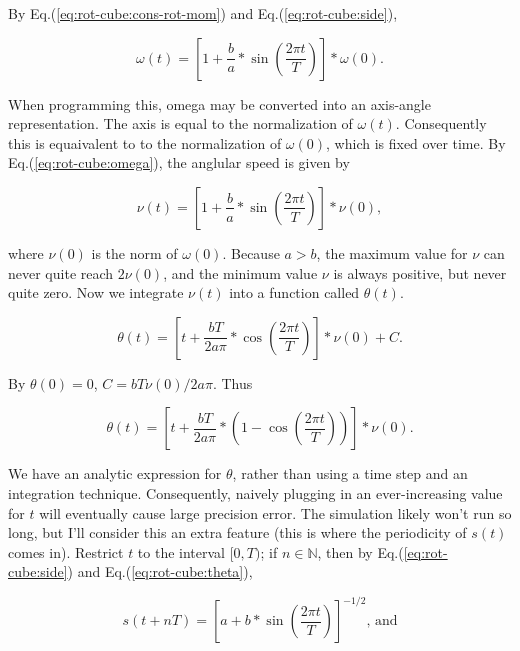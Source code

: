 \documentclass[a4paper,12pt]{book}
\begin{document}
By Eq.(\ref{eq:rot-cube:cons-rot-mom}) and Eq.(\ref{eq:rot-cube:side}),

\begin{equation}\label{eq:rot-cube:omega}
\omega(t) = \left[ 1 + \frac{b}{a} * \sin\left(\frac{2 \pi t}{T}\right) \right] * \omega(0).
\end{equation}

When programming this, omega may be converted into an axis-angle representation. The axis is equal to the normalization of $\omega(t)$. Consequently this is equaivalent to to the normalization of $\omega(0)$, which is fixed over time. By Eq.(\ref{eq:rot-cube:omega}), the anglular speed is given by

\begin{equation}\label{eq:rot-cub:nu}
\nu(t) = \left[ 1 + \frac{b}{a} * \sin\left(\frac{2 \pi t}{T}\right) \right] * \nu(0),
\end{equation}

where $\nu(0)$ is the norm of $\omega(0)$. Because $a > b$, the maximum value for $\nu$ can never quite reach $2 \nu(0)$, and the minimum value $\nu$ is always positive, but never quite zero. Now we integrate $\nu(t)$ into a function called $\theta(t)$.

\begin{equation*}
\theta(t) = \left[t + \frac{b T}{2 a \pi} * \cos\left(\frac{2 \pi t}{T}\right) \right] * \nu(0) + C.
\end{equation*}

By $\theta(0)= 0$, $C = b T \nu(0) / 2 a \pi$. Thus

\begin{equation}\label{eq:rot-cube:theta}
\theta(t) = \left[t + \frac{b T}{2 a \pi} * \left( 1 - \cos\left(\frac{2 \pi t}{T}\right) \right) \right] * \nu(0).
\end{equation}

We have an analytic expression for $\theta$, rather than using a time step and an integration technique. 
Consequently, naively plugging in an ever-increasing value for $t$ will eventually cause large precision error. 
The simulation likely won't run so long, but I'll consider this an extra feature (this is where the periodicity of $s(t)$ comes in). Restrict $t$ to the interval $[0,T)$; if $n \in \mathbb{N}$, then by Eq.(\ref{eq:rot-cube:side}) and Eq.(\ref{eq:rot-cube:theta}),


\begin{equation*}
s(t + n T) = \left[ a + b * \sin\left(\frac{2 \pi t}{T}\right) \right]^{-1/2}\text{, and}
\end{equation*}
\end{document}
